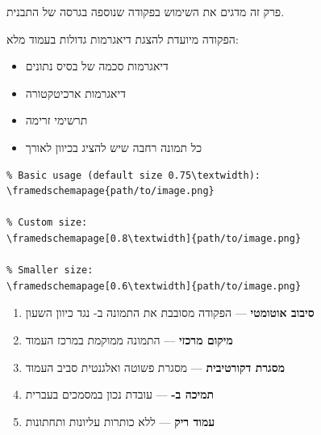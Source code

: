 \documentclass[book]{hebrew-academic-template}
\begin{document}
\maketitle
\tableofcontents


פרק זה מדגים את השימוש בפקודה  שנוספה בגרסה  של התבנית.


הפקודה  מיועדת להצגת דיאגרמות גדולות בעמוד מלא:
\begin{itemize}
    \item דיאגרמות סכמה של בסיס נתונים
    \item דיאגרמות ארכיטקטורה
    \item תרשימי זרימה
    \item כל תמונה רחבה שיש להציג בכיוון לאורך
\end{itemize}


\begin{english}
\begin{verbatim}
% Basic usage (default size 0.75\textwidth):
\framedschemapage{path/to/image.png}

% Custom size:
\framedschemapage[0.8\textwidth]{path/to/image.png}

% Smaller size:
\framedschemapage[0.6\textwidth]{path/to/image.png}
\end{verbatim}
\end{english}


\begin{enumerate}
    \item \textbf{סיבוב אוטומטי} --- הפקודה מסובבת את התמונה ב- נגד כיוון השעון
    \item \textbf{מיקום מרכזי} --- התמונה ממוקמת במרכז העמוד
    \item \textbf{מסגרת דקורטיבית} --- מסגרת פשוטה ואלגנטית סביב העמוד
    \item \textbf{תמיכה ב-} --- עובדת נכון במסמכים בעברית
    \item \textbf{עמוד ריק} --- ללא כותרות עליונות ותחתונות
\end{enumerate}
\end{document}
